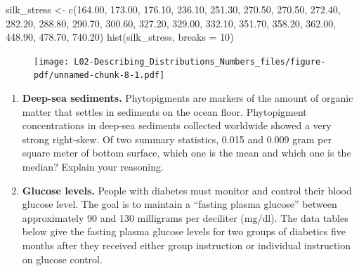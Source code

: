 \documentclass[
  letterpaper,
  DIV=11,
  numbers=noendperiod]{scrreprt}
\newenvironment{Shaded}{\begin{snugshade}}{\end{snugshade}}
\newcommand{\AttributeTok}[1]{\textcolor[rgb]{0.40,0.45,0.13}{#1}}
\newcommand{\DecValTok}[1]{\textcolor[rgb]{0.68,0.00,0.00}{#1}}
\newcommand{\FloatTok}[1]{\textcolor[rgb]{0.68,0.00,0.00}{#1}}
\newcommand{\FunctionTok}[1]{\textcolor[rgb]{0.28,0.35,0.67}{#1}}
\newcommand{\NormalTok}[1]{\textcolor[rgb]{0.00,0.23,0.31}{#1}}
\newcommand{\OtherTok}[1]{\textcolor[rgb]{0.00,0.23,0.31}{#1}}
\begin{document}
\begin{Shaded}
\begin{Highlighting}[]
\NormalTok{silk\_stress }\OtherTok{\textless{}{-}} \FunctionTok{c}\NormalTok{(}\FloatTok{164.00}\NormalTok{, }\FloatTok{173.00}\NormalTok{, }\FloatTok{176.10}\NormalTok{, }\FloatTok{236.10}\NormalTok{, }\FloatTok{251.30}\NormalTok{, }\FloatTok{270.50}\NormalTok{, }\FloatTok{270.50}\NormalTok{,}
    \FloatTok{272.40}\NormalTok{, }\FloatTok{282.20}\NormalTok{, }\FloatTok{288.80}\NormalTok{, }\FloatTok{290.70}\NormalTok{, }\FloatTok{300.60}\NormalTok{, }\FloatTok{327.20}\NormalTok{, }\FloatTok{329.00}\NormalTok{,}
    \FloatTok{332.10}\NormalTok{, }\FloatTok{351.70}\NormalTok{, }\FloatTok{358.20}\NormalTok{, }\FloatTok{362.00}\NormalTok{, }\FloatTok{448.90}\NormalTok{, }\FloatTok{478.70}\NormalTok{, }\FloatTok{740.20}\NormalTok{)}
\FunctionTok{hist}\NormalTok{(silk\_stress, }\AttributeTok{breaks =} \DecValTok{10}\NormalTok{)}
\end{Highlighting}
\end{Shaded}

\begin{figure}[H]

{\centering \texttt{[image: L02-Describing\_Distributions\_Numbers\_files/figure-pdf/unnamed-chunk-8-1.pdf]}

}

\end{figure}

\begin{enumerate}
\def\labelenumi{\arabic{enumi}.}
\setcounter{enumi}{1}
\item
  \textbf{Deep-sea sediments.} Phytopigments are markers of the amount
  of organic matter that settles in sediments on the ocean floor.
  Phytopigment concentrations in deep-sea sediments collected worldwide
  showed a very strong right-skew. Of two summary statistics, 0.015 and
  0.009 gram per square meter of bottom surface, which one is the mean
  and which one is the median? Explain your reasoning.
\item
  \textbf{Glucose levels.} People with diabetes must monitor and control
  their blood glucose level. The goal is to maintain a ``fasting plasma
  glucose'' between approximately 90 and 130 milligrams per deciliter
  (mg/dl). The data tables below give the fasting plasma glucose levels
  for two groups of diabetics five months after they received either
  group instruction or individual instruction on glucose control.
\end{enumerate}
\end{document}
